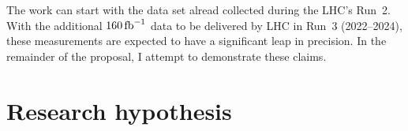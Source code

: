 \documentclass[a4paper,11pt]{article}
\newcommand{\Pb}{{{\Pqb}}\xspace}
\newcommand{\PAb}{{{{\Paqb}}}\xspace}
\renewcommand{\PV}{{{{V}}}\xspace}
\newcommand{\VH}{{{\PV}{\PH}}\xspace}
\begin{document}



The work can start with the data set alread collected during the LHC's Run~2. 
With the additional $160\mbox{\ensuremath{\,\text{fb}^{-1}}}$ data to be delivered by LHC in Run~3 (2022--2024), these measurements are expected to have a significant leap in precision. In the remainder of the proposal, I attempt to demonstrate these claims.


\section{Research hypothesis}
\label{sec:research_hypo}

\end{document}
